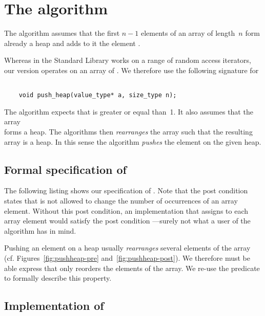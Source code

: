 
\section{The \pushheap algorithm}

The \pushheap algorithm assumes that the first $n-1$ elements of an array
of length~$n$ form already a heap and adds to it the element .

Whereas in the \cxx Standard Library \cite[\S 28.7.7.1]{cxx-17-draft}
\pushheap works on a range of random access iterators,
our version operates on an array of .
We therefore use the following signature for \pushheap

\begin{lstlisting}[style = acsl-block]

    void push_heap(value_type* a, size_type n);
\end{lstlisting}


The \pushheap algorithm expects that  is greater or equal than~1.
It also assumes that the array\\
 forms a heap.
The algorithms then \emph{rearranges} the array  such that the 
resulting array is a heap.
In this sense the algorithm \emph{pushes} the element  on the given heap.

\subsection{Formal specification of \pushheap}

The following listing shows our specification of \pushheap.
Note that the post condition  states
that \pushheap is not allowed to change the number of occurrences
of an array element.
Without this post condition,
an implementation that assigns  to each array element
would satisfy the post condition ---surely
not what a user of the algorithm has in mind.



Pushing an element on a heap usually \emph{rearranges} several elements of the array
(cf.\xspace Figures~\ref{fig:pushheap-pre} and~\ref{fig:pushheap-post}).
We therefore must be able express that \pushheap only reorders
the elements of the array.
We re-use the predicate  to formally describe this property.


\subsection{Implementation of \pushheap}


